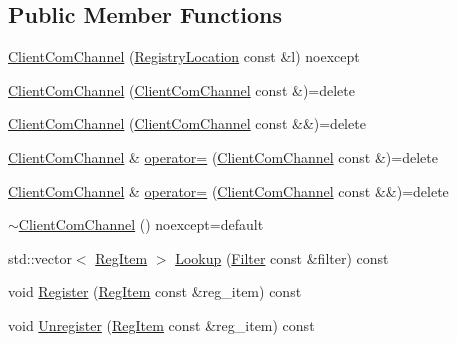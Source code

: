 \subsection*{Public Member Functions}
\begin{DoxyCompactItemize}
\item 
\hyperlink{classregistry_1_1ClientComChannel_a5c2b0bc24a8b841c3a713dc9575a0917}{Client\+Com\+Channel} (\hyperlink{structregistry_1_1RegistryLocation}{Registry\+Location} const \&l) noexcept
\item 
\hyperlink{classregistry_1_1ClientComChannel_acbda0cc868a2dbfb8070688b758ca8b2}{Client\+Com\+Channel} (\hyperlink{classregistry_1_1ClientComChannel}{Client\+Com\+Channel} const \&)=delete
\item 
\hyperlink{classregistry_1_1ClientComChannel_a6af8524e3b31d52df3e28d0da71d5dee}{Client\+Com\+Channel} (\hyperlink{classregistry_1_1ClientComChannel}{Client\+Com\+Channel} const \&\&)=delete
\item 
\hyperlink{classregistry_1_1ClientComChannel}{Client\+Com\+Channel} \& \hyperlink{classregistry_1_1ClientComChannel_a70bdd7f48a91b7f6c4cf226f9203efbe}{operator=} (\hyperlink{classregistry_1_1ClientComChannel}{Client\+Com\+Channel} const \&)=delete
\item 
\hyperlink{classregistry_1_1ClientComChannel}{Client\+Com\+Channel} \& \hyperlink{classregistry_1_1ClientComChannel_ac3572b1e8e9edd73fe7717186ce41ef6}{operator=} (\hyperlink{classregistry_1_1ClientComChannel}{Client\+Com\+Channel} const \&\&)=delete
\item 
\hyperlink{classregistry_1_1ClientComChannel_a7e10fd32266882e6c18731533a7dc2b6}{$\sim$\+Client\+Com\+Channel} () noexcept=default
\item 
std\+::vector$<$ \hyperlink{classregistry_1_1RegItem}{Reg\+Item} $>$ \hyperlink{classregistry_1_1ClientComChannel_a564ba5480214a74c5697120084cafb54}{Lookup} (\hyperlink{classregistry_1_1Filter}{Filter} const \&filter) const
\item 
void \hyperlink{classregistry_1_1ClientComChannel_ad5566f6f10790d9090975c5be8916d40}{Register} (\hyperlink{classregistry_1_1RegItem}{Reg\+Item} const \&reg\+\_\+item) const
\item 
void \hyperlink{classregistry_1_1ClientComChannel_a74566850580e7071fb6ec0f1f0498d05}{Unregister} (\hyperlink{classregistry_1_1RegItem}{Reg\+Item} const \&reg\+\_\+item) const
\end{DoxyCompactItemize}
